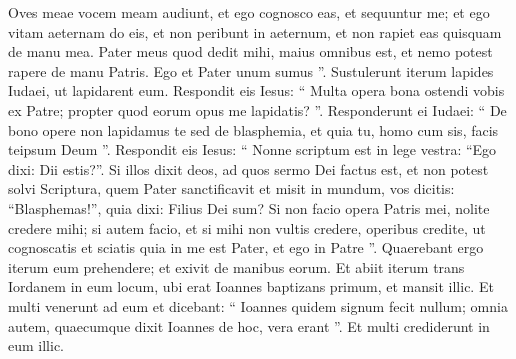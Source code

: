 \begin{biblechapter}
\begin{biblechapter}
\begin{biblechapter}
\begin{biblechapter}
\begin{biblechapter}
\begin{biblechapter}
\begin{biblechapter}
\begin{biblechapter}
\begin{biblechapter}
\begin{biblechapter}
\verse Oves meae vocem meam audiunt, et ego cognosco eas, et sequuntur me; 
\verse et ego vitam aeternam do eis, et non peribunt in aeternum, et non rapiet eas quisquam de manu mea. 
\verse Pater meus quod dedit mihi, maius omnibus est, et nemo potest rapere de manu Patris. 
\verse Ego et Pater unum sumus ”.
 \verse Sustulerunt iterum lapides Iudaei, ut lapidarent eum. 
\verse Respondit eis Iesus: “ Multa opera bona ostendi vobis ex Patre; propter quod eorum opus me lapidatis? ”. 
\verse Responderunt ei Iudaei: “ De bono opere non lapidamus te sed de blasphemia, et quia tu, homo cum sis, facis teipsum Deum ”. 
\verse Respondit eis Iesus: “ Nonne scriptum est in lege vestra: “Ego dixi: Dii estis?”. 
\verse Si illos dixit deos, ad quos sermo Dei factus est, et non potest solvi Scriptura, 
\verse quem Pater sanctificavit et misit in mundum, vos dicitis: “Blasphemas!”, quia dixi: Filius Dei sum? 
\verse Si non facio opera Patris mei, nolite credere mihi; 
\verse si autem facio, et si mihi non vultis credere, operibus credite, ut cognoscatis et sciatis quia in me est Pater, et ego in Patre ”. 
\verse Quaerebant ergo iterum eum prehendere; et exivit de manibus eorum.
 \verse Et abiit iterum trans Iordanem in eum locum, ubi erat Ioannes baptizans primum, et mansit illic. 
\verse Et multi venerunt ad eum et dicebant: “ Ioannes quidem signum fecit nullum; omnia autem, quaecumque dixit Ioannes de hoc, vera erant ”. 
\verse Et multi crediderunt in eum illic.
 

\end{biblechapter}
\end{biblechapter}
\end{biblechapter}
\end{biblechapter}
\end{biblechapter}
\end{biblechapter}
\end{biblechapter}
\end{biblechapter}
\end{biblechapter}
\end{biblechapter}
